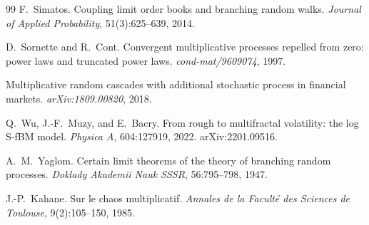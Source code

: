 \documentclass[11pt]{article}
\begin{document}
\begin{thebibliography}{99}
F.~Simatos.
\newblock Coupling limit order books and branching random walks.
\newblock \emph{Journal of Applied Probability}, 51(3):625--639, 2014.

D.~Sornette and R.~Cont.
\newblock Convergent multiplicative processes repelled from zero: power laws and truncated power laws.
\newblock \emph{cond-mat/9609074}, 1997.

Multiplicative random cascades with additional stochastic process in financial markets.
\newblock \emph{arXiv:1809.00820}, 2018.

Q.~Wu, J.-F.~Muzy, and E.~Bacry.
\newblock From rough to multifractal volatility: the log S-fBM model.
\newblock \emph{Physica A}, 604:127919, 2022. arXiv:2201.09516.

A.~M.~Yaglom.
\newblock Certain limit theorems of the theory of branching random processes.
\newblock \emph{Doklady Akademii Nauk SSSR}, 56:795--798, 1947.

J.-P.~Kahane.
\newblock Sur le chaos multiplicatif.
\newblock \emph{Annales de la Facult\'e des Sciences de Toulouse}, 9(2):105--150, 1985.

\end{thebibliography}
\end{document}
